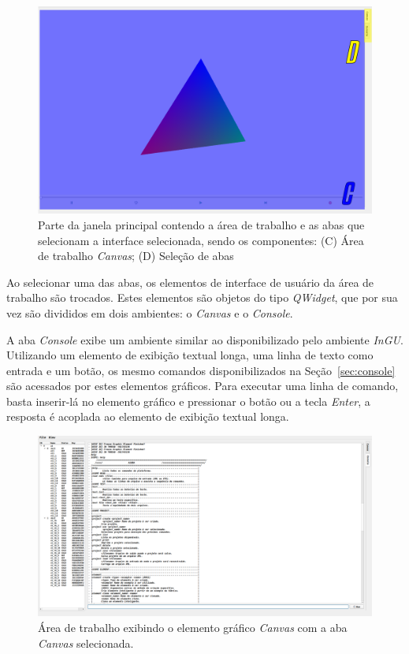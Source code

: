 \begin{figure}[!htbp]
	\centering
	\includegraphics[width=\linewidth]{Figures/IGU_001a_34.png}
	\caption{Parte da janela principal contendo a área de trabalho e as abas que selecionam a interface selecionada, sendo os componentes: (C) Área de trabalho \textit{Canvas}; (D) Seleção de abas}
	\label{fig:abas}
\end{figure}

Ao selecionar uma das abas, os elementos de interface de usuário da área de trabalho são trocados. Estes elementos são objetos do tipo \textit{QWidget}, que por sua vez são divididos em dois ambientes: o \textit{Canvas} e o \textit{Console}. 

A aba \textit{Console} exibe um ambiente similar ao disponibilizado pelo ambiente \textit{InGU}. Utilizando um elemento de exibição textual longa, uma linha de texto como entrada e um botão, os mesmo comandos disponibilizados na Seção~\ref{sec:console} são acessados por estes elementos gráficos. Para executar uma linha de comando, basta inserir-lá no elemento gráfico e pressionar o botão ou a tecla \textit{Enter}, a resposta é acoplada ao elemento de exibição textual longa.

\begin{figure}
	\centering
	\includegraphics[width=.9\linewidth]{Figures/IGU_017.png}
	\caption{Área de trabalho exibindo o elemento gráfico \textit{Canvas} com a aba \textit{Canvas} selecionada.}
	\label{fig:sfig1}
\end{figure}

